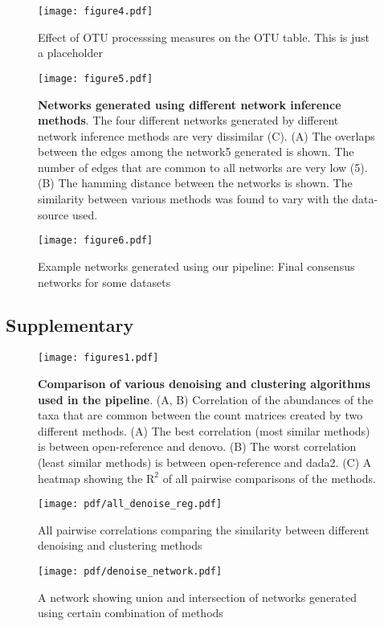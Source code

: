 \begin{figure}[h]
  \centering
  \texttt{[image: figure4.pdf]}
  \caption{Effect of OTU processsing measures on the OTU table. This is just a placeholder}
  \label{fig:figure4}
\end{figure}

\begin{figure}[h]
  \centering
  \texttt{[image: figure5.pdf]}
  \caption{
    \textbf{Networks generated using different network inference methods}.
    The four different networks generated by different network inference methods are very dissimilar (C).
    (A) The overlaps between the edges among the network5 generated is shown. The number of edges that are common to all networks are very low (5).
    (B) The hamming distance between the networks is shown. The similarity between various methods was found to vary with the data-source used.
}
  \label{fig:figure5}
\end{figure}

\begin{figure}[h]
  \centering
  \texttt{[image: figure6.pdf]}
  \caption{Example networks generated using our pipeline: Final consensus networks for some datasets}
  \label{fig:figure6}
\end{figure}

\FloatBarrier

\subsection*{Supplementary}%

\begin{figure}[h]
  \centering
  \texttt{[image: figures1.pdf]}
  \caption{
    \textbf{Comparison of various denoising and clustering algorithms used in the pipeline}.
    (A, B) Correlation of the abundances of the taxa that are common between the count matrices created by two different methods.
    (A) The best correlation (most similar methods) is between open-reference and denovo.
    (B) The worst correlation (least similar methods) is between open-reference and dada2.
    (C) A heatmap showing the $\mathrm{R}^2$ of all pairwise comparisons of the methods.
  }
  \label{fig:figures1}
\end{figure}

\begin{figure}[h]
  \centering
  \texttt{[image: pdf/all\_denoise\_reg.pdf]}
  \caption{All pairwise correlations comparing the similarity between different denoising and clustering methods}
  \label{fig:figures2}
\end{figure}

\begin{figure}[h]
  \centering
  \texttt{[image: pdf/denoise\_network.pdf]}
  \caption{A network showing union and intersection of networks generated using certain combination of methods}
  \label{fig:pdf/denoise_network}
\end{figure}





